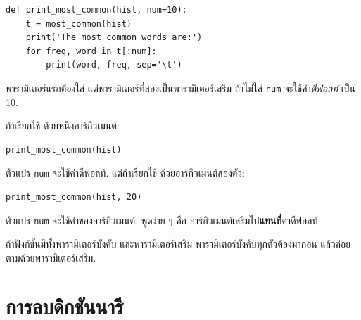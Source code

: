 \begin{verbatim}
def print_most_common(hist, num=10):
    t = most_common(hist)
    print('The most common words are:')
    for freq, word in t[:num]:
        print(word, freq, sep='\t')
\end{verbatim}


พารามิเตอร์แรกต้องใส่ 
แต่พารามิเตอร์ที่สองเป็นพารามิเตอร์เสริม 
ถ้าไม่ใส่ \texttt{num} จะใช้ค่า\textit{ดีฟอลท์} เป็น 10. 

ถ้าเรียกใช้ ด้วยหนึ่งอาร์กิวเมนต์:

\begin{verbatim}
print_most_common(hist)
\end{verbatim}

ตัวแปร \texttt{num} จะใช้ค่าดีฟอลท์.
แต่ถ้าเรียกใช้ ด้วยอาร์กิวเมนต์สองตัว:

\begin{verbatim}
print_most_common(hist, 20)
\end{verbatim}


ตัวแปร \texttt{num} จะใช้ค่าของอาร์กิวเมนต์.
พูดง่าย ๆ คือ อาร์กิวเมนต์เสริมไป\textbf{แทนที่}ค่าดีฟอลท์.


ถ้าฟังก์ชันมีทั้งพารามิเตอร์บังคับ และพารามิเตอร์เสริม
พารามิเตอร์บังคับทุกตัวต้องมาก่อน แล้วค่อยตามด้วยพารามิเตอร์เสริม.

\section{การลบดิกชันนารี}
\label{dictsub}


